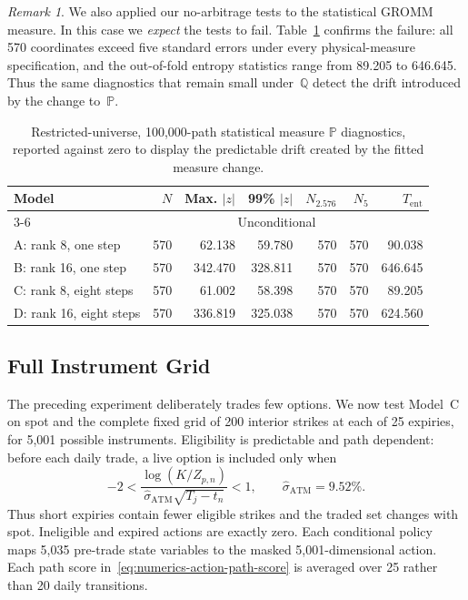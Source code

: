 \documentclass[11pt]{article}
\newcommand{\Q}{\mathbb Q}
\newcommand{\PP}{\mathbb P}
\newcommand{\abs}[1]{\lvert #1\rvert}
\theoremstyle{plain}
\theoremstyle{definition}
\theoremstyle{remark}
\newtheorem{remark}[theorem]{Remark}
\begin{document}
\begin{remark}
We also applied our no-arbitrage tests to the statistical GROMM measure.
In this case we \emph{expect} the tests to fail.
Table~\ref{tab:numerics-restricted-p} confirms the failure:
all 570 coordinates exceed five standard errors under every physical-measure
specification, and the out-of-fold entropy statistics range from 89.205 to
646.645.  Thus the same diagnostics that remain small under~$\Q$ detect the drift introduced by the change to~$\PP$.
\begin{table}[H]
\centering
\small
\begin{tabular}{lrrrrrr}
\toprule
Model & $N$ & Max. $\abs{z}$ & 99\% $\abs{z}$
  & $N_{2.576}$ & $N_5$ & $T_{\mathrm{ent}}$\\
\cmidrule(lr){3-6}
 & & \multicolumn{4}{c}{Unconditional} & \\
\midrule
A: rank 8, one step    & 570 & 62.138 & 59.780 & 570 & 570 & 90.038\\
B: rank 16, one step   & 570 & 342.470 & 328.811 & 570 & 570 & 646.645\\
C: rank 8, eight steps & 570 & 61.002 & 58.398 & 570 & 570 & 89.205\\
D: rank 16, eight steps& 570 & 336.819 & 325.038 & 570 & 570 & 624.560\\
\bottomrule
\end{tabular}
\caption{Restricted-universe, 100,000-path statistical measure $\PP$ diagnostics, reported against
zero to display the predictable drift created by the fitted
measure change.}
\label{tab:numerics-restricted-p}
\end{table}
\end{remark}

\subsection{Full Instrument Grid}
\label{sec:numerics-full-instrument-grid}

The preceding experiment deliberately trades few options.  We now test
Model~C on spot and the complete fixed grid of 200 interior strikes at each of
25 expiries, for 5,001 possible instruments.  Eligibility is predictable and
path dependent: before each daily trade, a live option is included only when
\[
  -2 < \frac{\log(K/Z_{p,n})}
  {\widehat\sigma_{\mathrm{ATM}}\sqrt{T_j-t_n}} < 1,
  \qquad \widehat\sigma_{\mathrm{ATM}}=9.52\%.
\]
Thus short expiries contain fewer eligible strikes and the traded set changes
with spot.  Ineligible and expired actions are exactly zero.  Each conditional
policy maps 5,035 pre-trade state variables to the masked 5,001-dimensional
action.  Each path score in~\eqref{eq:numerics-action-path-score} is averaged
over 25 rather than 20 daily transitions.
\end{document}
